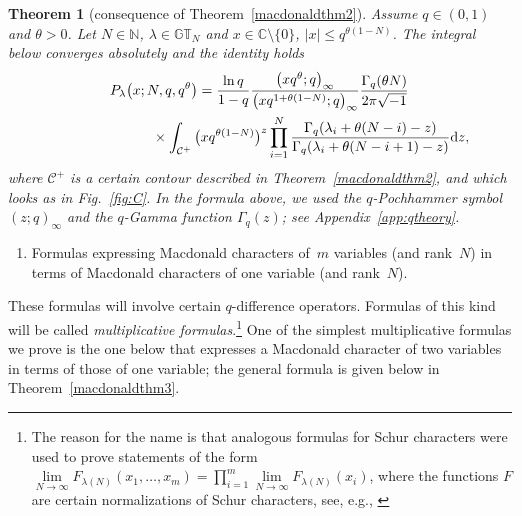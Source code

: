 \documentclass[pdftex]{sigma}
\numberwithin{equation}{section}
\newtheorem{thm}{Theorem}[section]
\newcommand{\C}{\mathbb{C}}
\newcommand{\N}{\mathbb{N}}
\newcommand{\CC}{\mathcal{C}}
\newcommand{\GT}{\mathbb{GT}}
\begin{document}
\begin{thm}[consequence of Theorem~\ref{macdonaldthm2}]
Assume $q\in (0, 1)$ and $\theta > 0$. Let $N\in\N$, $\lambda\in\GT_N$ and $x\in\C\setminus\{0\}$, $|x|\leq q^{\theta(1-N)}$. The integral below converges absolutely and the identity holds
\begin{gather}
P_{\lambda}\big(x; N, q, q^{\theta}\big) = \frac{\ln q}{1 - q}\frac{\big(xq^{\theta}; q\big)_{\infty}}{\big(xq^{1 + \theta(1 - N)}; q\big)_{\infty}}\frac{\Gamma_q(\theta N)}{2\pi\sqrt{-1}}\nonumber\\
\hphantom{P_{\lambda}\big(x; N, q, q^{\theta}\big) =}{} \times\int_{\CC^+}{\big(xq^{\theta(1-N)}\big)^z\prod_{i=1}^N{\frac{\Gamma_q(\lambda_i + \theta(N-i)-z)}{\Gamma_q(\lambda_i + \theta(N-i+1)-z)}}{\rm d}z},\label{macdonaldthm2eqnreform}
\end{gather}
where $\CC^+$ is a certain contour described in Theorem~{\rm \ref{macdonaldthm2}}, and which looks as in Fig.~{\rm \ref{fig:C}}.
In the formula above, we used the $q$-Pochhammer symbol $(z; q)_{\infty}$ and the $q$-Gamma function $\Gamma_q(z)$; see Appendix~{\rm \ref{app:qtheory}}.
\end{thm}

\begin{enumerate}\itemsep=0pt
\item[(B)] Formulas expressing Macdonald characters of~$m$ variables (and rank~$N$) in terms of Macdonald characters of one variable (and rank~$N$).
\end{enumerate}

These formulas will involve certain $q$-dif\/ference operators. Formulas of this kind will be called \textit{multiplicative formulas}.\footnote{The reason for the name is that analogous formulas for Schur characters were used to prove statements of the form $\lim\limits_{N\rightarrow\infty}{F_{\lambda(N)}(x_1, \dots, x_m)} = \prod\limits_{i=1}^m{\lim\limits_{N\rightarrow\infty}{F_{\lambda(N)}(x_i)}}$, where the functions $F$ are certain normalizations of Schur characters, see, e.g., \cite[Corollaries 3.10 and 3.12]{GP}} One of the simplest multiplicative formulas we prove is the one below that expresses a Macdonald character of two variables in terms of those of one variable; the general formula is given below in Theorem~\ref{macdonaldthm3}.
\end{document}
